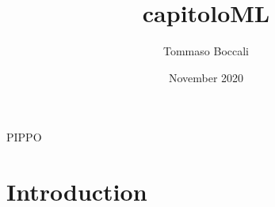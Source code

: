 \documentclass{article}
\title{capitoloML}
\author{Tommaso Boccali }
\date{November 2020}
\begin{document}
PIPPO
\maketitle

\section{Introduction}
\end{document}
